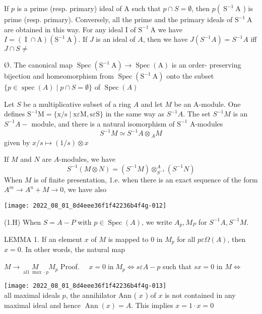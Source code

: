 If $p$ is a prime (resp. primary) ideal of A such that $p \cap S=\emptyset$, then $p\left(\mathrm{~S}^{-1} \mathrm{~A}\right.$ ) is prime (resp. primary). Conversely, all the prime and the primary ideals of $\mathrm{S}^{-1} \mathrm{~A}$ are obtained in this way. For any ideal I of $\mathrm{S}^{-1} \mathrm{~A}$ we have $I=(\operatorname{I} \cap \mathrm{A})\left(\mathrm{S}^{-1} \mathrm{~A}\right)$. If $J$ is an ideal of $A$, then we have $J\left(S^{-1} A\right)=S^{-1} A$ iff $J \cap S \neq$

Ø. The canonical map $\operatorname{Spec}\left(\mathrm{S}^{-1} \mathrm{~A}\right) \rightarrow \operatorname{Spec}(\mathrm{A})$ is an order- preserving bijection and homeomorphism from $\operatorname{Spec}\left(\mathrm{S}^{-1} \mathrm{~A}\right)$ onto the subset $\{p \in \operatorname{spec}(A) \mid p \cap S=\emptyset\}$ of $\operatorname{Spec}(A)$

Let $S$ be a multiplicative subset of a ring $A$ and let $M$ be an A-module. One defines $\mathrm{S}^{-1} \mathrm{M}=\{\mathrm{x} / \mathrm{s} \mid \mathrm{x} \varepsilon \mathrm{M}, \mathrm{s} \varepsilon \mathrm{S}\}$ in the same way as $S^{-1} A$. The set $S^{-1} M$ is an $S^{-1} A-$ module, and there is a natural isomorphism of $\mathrm{S}^{-1}$ A-modules
$$
S^{-1} M \simeq S^{-1} A \otimes{ }_{A} M
$$
given by $x / s \mapsto(1 / s) \otimes x$

If $M$ and $N$ are $A$-modules, we have
$$
S^{-1}(M \otimes N)=\left(S^{-1} M\right) \otimes_{S^{-1}}^{A}\left(S^{-1} N\right)
$$
When $M$ is of finite presentation, 1.e. when there is an exact sequence of the form $A^{m} \rightarrow A^{n}+M \rightarrow 0$, we have also

\texttt{[image: 2022\_08\_01\_8d4eee36f1f42236b4f4g-012]}

(1.H) When $S=A-P$ with $p \in \operatorname{Spec}(A)$, we write $A_{p}, M_{P}$ for $S^{-1} A, S^{-1} M$.

LEMMA 1. If an element $x$ of $M$ is mapped to 0 in $M_{p}$ for all $p \varepsilon \Omega(A)$, then $x=0$. In other words, the natural map

$M \rightarrow \underset{\operatorname{al1} \max \cdot p}{M} M_{p}$ Proof. $\quad x=0 \operatorname{in} M_{p} \Leftrightarrow s \varepsilon A-p$ such that $s x=0$ in $M \Leftrightarrow$

\texttt{[image: 2022\_08\_01\_8d4eee36f1f42236b4f4g-013]}\\
all maximal ideals $p$, the annihilator Ann ( $x$ ) of $x$ is not contained in any maximal ideal and hence $\operatorname{Ann}(x)=A$. This implies $x=1 \cdot x=0$

